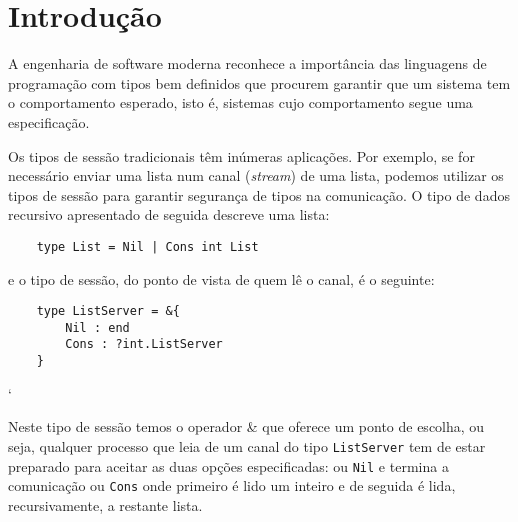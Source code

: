
\section{Introdução}
\label{sec:intro}

A engenharia de software moderna reconhece a importância das linguagens de programação com tipos bem definidos que procurem garantir que um sistema tem o comportamento esperado, isto é, sistemas cujo comportamento segue uma especificação.



Os tipos de sessão tradicionais têm inúmeras aplicações. Por exemplo, se for necessário enviar uma lista num canal (\textit{stream}) de uma lista, podemos utilizar os tipos de sessão para garantir segurança de tipos na comunicação. O tipo de dados recursivo apresentado de seguida descreve uma lista:
\begin{lstlisting}
	type List = Nil | Cons int List
\end{lstlisting}
e o tipo de sessão, do ponto de vista de quem lê o canal, é o seguinte:
\begin{lstlisting}
	type ListServer = &{
		Nil : end
		Cons : ?int.ListServer
	}
\end{lstlisting}`

Neste tipo de sessão temos o operador \& que oferece um ponto de escolha, ou seja, qualquer processo que leia de um canal do tipo \lstinline"ListServer" tem de estar preparado para aceitar as duas opções especificadas: ou \lstinline"Nil" e termina a comunicação ou \lstinline"Cons" onde primeiro é lido um inteiro e de seguida é lida, recursivamente, a restante lista.

